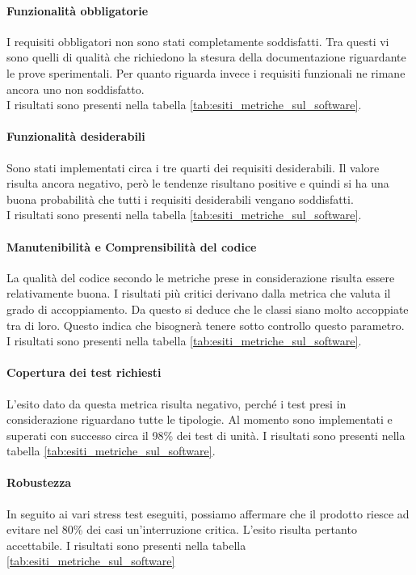 \documentclass[../PianoDiQualifica.tex]{subfiles}
\begin{document}
\begin{appendices}
			\paragraph{Funzionalità obbligatorie}
			I requisiti obbligatori non sono stati completamente soddisfatti. Tra questi vi sono quelli di qualità che richiedono la stesura della documentazione riguardante le prove sperimentali. Per quanto riguarda invece i requisiti funzionali ne rimane ancora uno non soddisfatto.\\
			I risultati sono presenti nella tabella \ref{tab:esiti_metriche_sul_software}.
			
			\paragraph{Funzionalità desiderabili}
			Sono stati implementati circa i tre quarti dei requisiti desiderabili. Il valore risulta ancora negativo, però le tendenze risultano positive e quindi si ha una buona probabilità che tutti i requisiti desiderabili vengano soddisfatti.\\
			I risultati sono presenti nella tabella \ref{tab:esiti_metriche_sul_software}.
			
			\paragraph{Manutenibilità e Comprensibilità del codice}
			La qualità del codice secondo le metriche prese in considerazione risulta essere relativamente buona. I risultati più critici derivano dalla metrica che valuta il grado di accoppiamento. Da questo si deduce che le classi siano molto accoppiate tra di loro. Questo indica che bisognerà tenere sotto controllo questo parametro.\\
			I risultati sono presenti nella tabella \ref{tab:esiti_metriche_sul_software}.
			
			\paragraph{Copertura dei test richiesti}
			L'esito dato da questa metrica risulta negativo, perché i test presi in considerazione riguardano tutte le tipologie. Al momento sono implementati e superati con successo circa il 98\% dei test di unità. 
			I risultati sono presenti nella tabella \ref{tab:esiti_metriche_sul_software}.
			
			\paragraph{Robustezza}
			In seguito ai vari stress test eseguiti, possiamo affermare che il prodotto riesce ad evitare nel 80\% dei casi un'interruzione critica. L'esito risulta pertanto accettabile.
			I risultati sono presenti nella tabella \ref{tab:esiti_metriche_sul_software}
			

\end{appendices}
\end{document}
